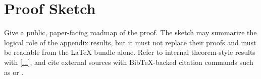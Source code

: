 \section{Proof Sketch}

Give a public, paper-facing roadmap of the proof. The sketch may summarize the
logical role of the appendix results, but it must not replace their proofs and
must be readable from the LaTeX bundle alone. Refer to internal theorem-style
results with \ref{...}, and cite external sources with BibTeX-backed citation
commands such as \citep{...} or \citet{...}.
